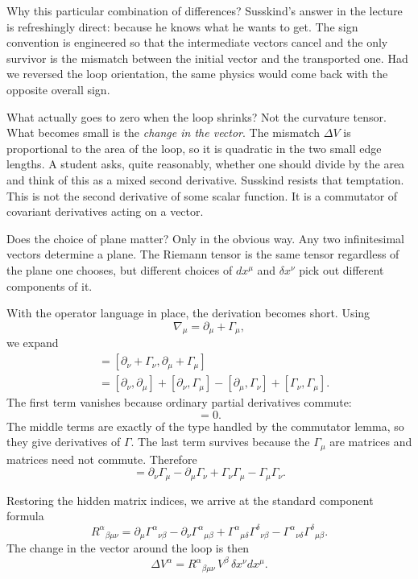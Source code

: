 Why this particular combination of differences? Susskind's answer in the lecture is refreshingly direct: because he knows what he wants to get. The sign convention is engineered so that the intermediate vectors cancel and the only survivor is the mismatch between the initial vector and the transported one. Had we reversed the loop orientation, the same physics would come back with the opposite overall sign.

What actually goes to zero when the loop shrinks? Not the curvature tensor. What becomes small is the \emph{change in the vector}. The mismatch \(\Delta V\) is proportional to the area of the loop, so it is quadratic in the two small edge lengths. A student asks, quite reasonably, whether one should divide by the area and think of this as a mixed second derivative. Susskind resists that temptation. This is not the second derivative of some scalar function. It is a commutator of covariant derivatives acting on a vector.

Does the choice of plane matter? Only in the obvious way. Any two infinitesimal vectors determine a plane. The Riemann tensor is the same tensor regardless of the plane one chooses, but different choices of \(dx^\mu\) and \(\delta x^\nu\) pick out different components of it.

With the operator language in place, the derivation becomes short. Using
\[
\nabla_\mu=\partial_\mu+\Gamma_\mu,
\]
we expand
\begin{align}
[\nabla_\nu,\nabla_\mu]
&=
[\partial_\nu+\Gamma_\nu,\partial_\mu+\Gamma_\mu] \\
&=
[\partial_\nu,\partial_\mu]
+
[\partial_\nu,\Gamma_\mu]
-
[\partial_\mu,\Gamma_\nu]
+
[\Gamma_\nu,\Gamma_\mu].
\end{align}
The first term vanishes because ordinary partial derivatives commute:
\begin{equation}
[\partial_\nu,\partial_\mu]=0.
\end{equation}
The middle terms are exactly of the type handled by the commutator lemma, so they give derivatives of \(\Gamma\). The last term survives because the \(\Gamma_\mu\) are matrices and matrices need not commute. Therefore
\begin{equation}
[\nabla_\nu,\nabla_\mu]
=
\partial_\nu\Gamma_\mu
-
\partial_\mu\Gamma_\nu
+
\Gamma_\nu\Gamma_\mu
-
\Gamma_\mu\Gamma_\nu.
\end{equation}

Restoring the hidden matrix indices, we arrive at the standard component formula
\begin{equation}
R^\alpha{}_{\beta\mu\nu}
=
\partial_\mu \Gamma^\alpha{}_{\nu\beta}
-
\partial_\nu \Gamma^\alpha{}_{\mu\beta}
+
\Gamma^\alpha{}_{\mu\delta}\Gamma^\delta{}_{\nu\beta}
-
\Gamma^\alpha{}_{\nu\delta}\Gamma^\delta{}_{\mu\beta}.
\end{equation}
The change in the vector around the loop is then
\begin{equation}
\Delta V^\alpha
=
R^\alpha{}_{\beta\mu\nu}\,V^\beta\,\delta x^\nu dx^\mu.
\end{equation}

